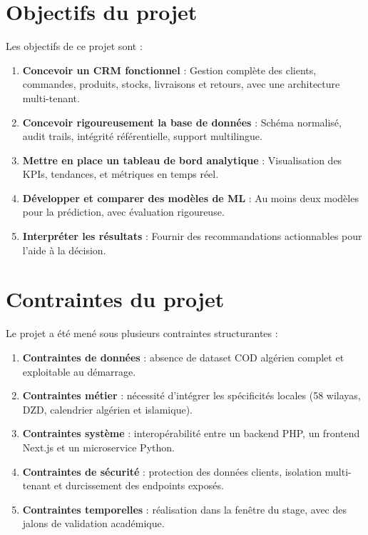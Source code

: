 \documentclass[12pt,a4paper]{report}
\begin{document}
\section{Objectifs du projet}

Les objectifs de ce projet sont :

\begin{enumerate}
  \item \textbf{Concevoir un CRM fonctionnel} : Gestion compl\`{e}te des clients, commandes, produits, stocks, livraisons et retours, avec une architecture multi-tenant.
  \item \textbf{Concevoir rigoureusement la base de donn\'{e}es} : Sch\'{e}ma normalis\'{e}, audit trails, int\'{e}grit\'{e} r\'{e}f\'{e}rentielle, support multilingue.
  \item \textbf{Mettre en place un tableau de bord analytique} : Visualisation des KPIs, tendances, et m\'{e}triques en temps r\'{e}el.
  \item \textbf{D\'{e}velopper et comparer des mod\`{e}les de ML} : Au moins deux mod\`{e}les pour la pr\'{e}diction, avec \'{e}valuation rigoureuse.
  \item \textbf{Interpr\'{e}ter les r\'{e}sultats} : Fournir des recommandations actionnables pour l'aide \`{a} la d\'{e}cision.
\end{enumerate}

\section{Contraintes du projet}

Le projet a \'{e}t\'{e} men\'{e} sous plusieurs contraintes structurantes :

\begin{enumerate}
  \item \textbf{Contraintes de donn\'{e}es} : absence de dataset COD alg\'{e}rien complet et exploitable au d\'{e}marrage.
  \item \textbf{Contraintes m\'{e}tier} : n\'{e}cessit\'{e} d'int\'{e}grer les sp\'{e}cificit\'{e}s locales (58 wilayas, DZD, calendrier alg\'{e}rien et islamique).
  \item \textbf{Contraintes syst\`{e}me} : interop\'{e}rabilit\'{e} entre un backend PHP, un frontend Next.js et un microservice Python.
  \item \textbf{Contraintes de s\'{e}curit\'{e}} : protection des donn\'{e}es clients, isolation multi-tenant et durcissement des endpoints expos\'{e}s.
  \item \textbf{Contraintes temporelles} : r\'{e}alisation dans la fen\^{e}tre du stage, avec des jalons de validation acad\'{e}mique.
\end{enumerate}
\end{document}

